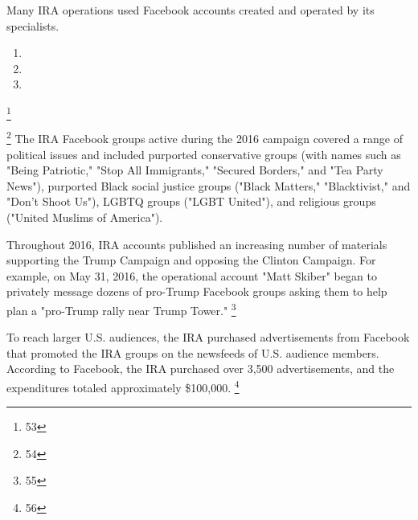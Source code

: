 Many IRA operations used Facebook accounts created and operated by its specialists.


\begin{enumerate}[i]
    \item {}
    \item {}
    \item {}
\end{enumerate}

\footnote{53}

\footnote{54}
The IRA Facebook groups active during the 2016 campaign covered a range of political issues and included purported conservative groups (with names such as "Being Patriotic,"  "Stop All Immigrants," "Secured Borders," and "Tea Party News"), purported Black social justice groups ("Black Matters,"  "Blacktivist," and "Don't Shoot Us"), LGBTQ groups ("LGBT United"), and religious groups ("United Muslims of America").

Throughout 2016, IRA accounts published an increasing number of materials supporting the Trump Campaign and opposing the Clinton Campaign.
For example, on May 31, 2016, the operational account "Matt Skiber" began to privately message dozens of pro-Trump Facebook groups asking them to help plan a "pro-Trump rally near Trump Tower."%
\footnote{55}

To reach larger U.S. audiences, the IRA purchased advertisements from Facebook that promoted the IRA groups on the newsfeeds of U.S. audience members.
According to Facebook, the IRA purchased over 3,500 advertisements, and the expenditures totaled approximately \$100,000.%
\footnote{56}

